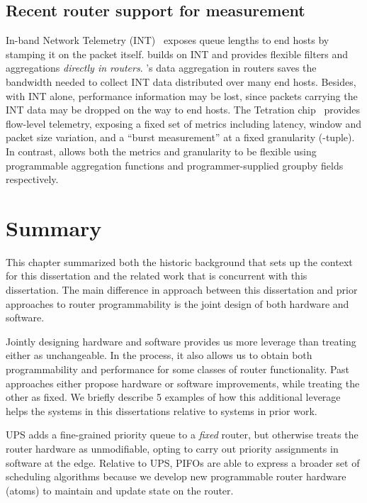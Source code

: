 \subsection{Recent router support for measurement} In-band Network Telemetry
(INT)~\cite{int, int_paper} exposes queue lengths to end hosts by stamping it
on the packet itself. \TheSystem builds on INT and provides flexible filters
and aggregations {\em directly in routers}.  \TheSystem's data aggregation in
routers saves the bandwidth needed to collect INT data distributed over many
end hosts. Besides, with INT alone, performance information may be lost, since
packets carrying the INT data may be dropped on the way to end hosts. The
Tetration chip~\cite{tetration-telemetry} provides flow-level telemetry,
exposing a fixed set of metrics including latency, window and packet size
variation, and a ``burst measurement'' at a fixed granularity (-tuple).
In contrast, \TheSystem allows both the metrics and granularity to be flexible
using programmable aggregation functions and programmer-supplied {\ct groupby}
fields respectively.

\section{Summary}
This chapter summarized both the historic background that sets up the context
for this dissertation and the related work that is concurrent with this
dissertation. The main difference in approach between this dissertation and
prior approaches to router programmability is the joint design of both
hardware and software.

Jointly designing hardware and software provides us more leverage than treating
either as unchangeable. In the process, it also allows us to obtain both
programmability and performance for some classes of router functionality.  Past
approaches either propose hardware or software improvements, while treating the
other as fixed. We briefly describe 5 examples of how this additional leverage
helps the systems in this dissertations relative to systems in prior work.

 UPS adds a fine-grained priority queue to a
{\em fixed} router, but otherwise treats the router hardware as unmodifiable,
opting to carry out priority assignments in software at the edge. Relative to
UPS, PIFOs are able to express a broader set of scheduling algorithms because
we develop new programmable router hardware (atoms) to maintain and update
state on the router.

